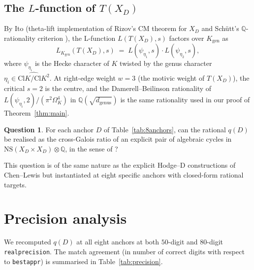 \documentclass[11pt,a4paper]{amsart}
\theoremstyle{plain}
\theoremstyle{definition}
\newtheorem{question}[theorem]{Question}
\newcommand{\Q}{\mathbb{Q}}
\newcommand{\Cl}{\mathrm{Cl}}
\newcommand{\Kgen}{K_{\mathrm{gen}}}
\begin{document}
\subsection{The $L$-function of $T(X_D)$}

By Ito \cite[Theorem 1.1 and \S 7]{Ito2024} (theta-lift implementation
of Rizov's CM theorem \cite{Rizov2010} for $X_D$ and Schütt's
$\Q$-rationality criterion \cite[Proposition 3.2]{Schutt2008}), the
L-function $L(T(X_D), s)$ factors over $\Kgen$ as
\begin{equation}\label{eq:Ito-Schutt}
  L_\Kgen(T(X_D), s) \;=\;
  L(\psi_{\eta_1}, s) \cdot L(\psi_{\eta_2}, s),
\end{equation}
where $\psi_{\eta_i}$ is the Hecke character of $K$ twisted by the
genus character $\eta_i \in \widehat{\Cl K / \Cl K^2}$. At
right-edge weight $w = 3$ (the motivic weight of $T(X_D)$), the
critical $s = 2$ is the centre, and the Damerell--Beilinson rationality
of $L(\psi_{\eta_i}, 2)/(\pi^2 \Omega_K^4)$ in $\Q(\sqrt{d_{\mathrm{genus}}})$
is the same rationality used in our proof of Theorem~\ref{thm:main}.

\begin{question}\label{q:Hodge-cycle}
For each anchor $D$ of Table~\ref{tab:8anchors}, can the rational
$q(D)$ be realised as the cross-Galois ratio of an explicit pair of
algebraic cycles in $\mathrm{NS}(X_D \times X_D) \otimes \Q$, in the sense
of \cite[\S 4]{ChenLewis2007}?
\end{question}

This question is of the same nature as the explicit Hodge--D
constructions of Chen--Lewis \cite{ChenLewis2007} but instantiated at
eight specific anchors with closed-form rational targets.

\section{Precision analysis}\label{sec:precision}

We recomputed $q(D)$ at all eight anchors at both $50$-digit and
$80$-digit \texttt{realprecision}. The match agreement (in number of
correct digits with respect to \texttt{bestappr}) is summarised in
Table~\ref{tab:precision}.
\end{document}
